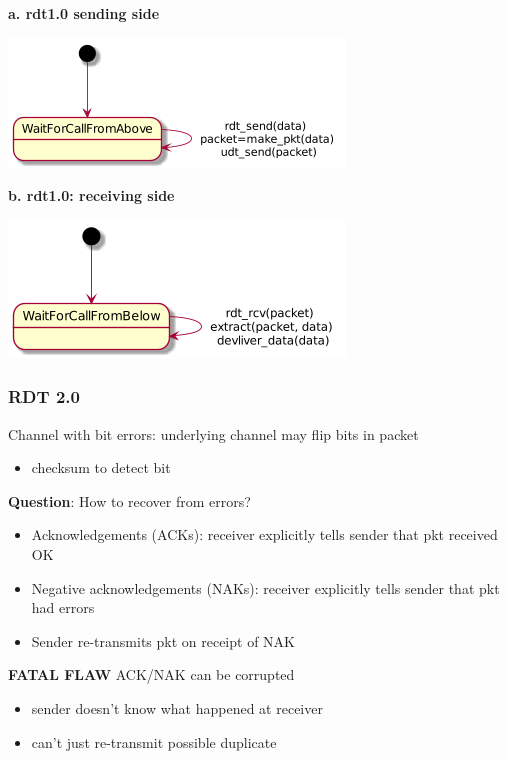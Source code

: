 \documentclass[11pt]{article}
\begin{document}
\textbf{a. rdt1.0 sending side}

\begin{center}
\includegraphics[width=.9\linewidth]{rdt1.0senderFSM.png}
\end{center}

\textbf{b. rdt1.0: receiving side}
\begin{center}
\includegraphics[width=.9\linewidth]{rdt1.0receiverFSM.png}
\end{center}


\subsubsection{RDT 2.0}
\label{sec:orgee901b5}
Channel with bit errors: underlying channel may flip bits in packet
\begin{itemize}
\item checksum to detect bit
\end{itemize}

\textbf{Question}: How to recover from errors?

\begin{itemize}
\item Acknowledgements (ACKs): receiver explicitly tells sender that pkt
received OK
\item Negative acknowledgements (NAKs): receiver explicitly tells sender
that pkt had errors
\item Sender re-transmits pkt on receipt of NAK
\end{itemize}

\textbf{FATAL FLAW}
ACK/NAK can be corrupted
\begin{itemize}
\item sender doesn't know what happened at receiver
\item can't just re-transmit possible duplicate
\end{itemize}
\end{document}
